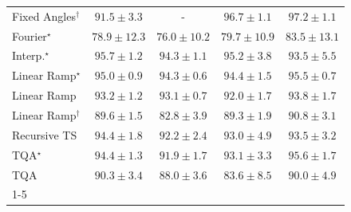 \begin{tabular}{l|cccc|}
Fixed Angles$^\dagger$ & {\cellcolor[HTML]{045D92}} \color[HTML]{F1F1F1} $91.5\pm 3.3$ & {\cellcolor[HTML]{000000}} \color[HTML]{F1F1F1} {\cellcolor{white}} \color{black} - & {\cellcolor[HTML]{023F64}} \color[HTML]{F1F1F1} $96.7\pm 1.1$ & {\cellcolor[HTML]{023C5F}} \color[HTML]{F1F1F1} $97.2\pm 1.1$ \\
Fourier$^\star$ & {\cellcolor[HTML]{4A98C5}} \color[HTML]{F1F1F1} $78.9\pm 12.3$ & {\cellcolor[HTML]{69A5CC}} \color[HTML]{F1F1F1} $76.0\pm 10.2$ & {\cellcolor[HTML]{4094C3}} \color[HTML]{F1F1F1} $79.7\pm 10.9$ & {\cellcolor[HTML]{1E80B8}} \color[HTML]{F1F1F1} $83.5\pm 13.1$ \\
Interp.$^\star$ & {\cellcolor[HTML]{03456C}} \color[HTML]{F1F1F1} $95.7\pm 1.2$ & {\cellcolor[HTML]{034D79}} \color[HTML]{F1F1F1} $94.3\pm 1.1$ & {\cellcolor[HTML]{034871}} \color[HTML]{F1F1F1} $95.2\pm 3.8$ & {\cellcolor[HTML]{045280}} \color[HTML]{F1F1F1} $93.5\pm 5.5$ \\
Linear Ramp$^\star$ & {\cellcolor[HTML]{034973}} \color[HTML]{F1F1F1} $95.0\pm 0.9$ & {\cellcolor[HTML]{034D79}} \color[HTML]{F1F1F1} $94.3\pm 0.6$ & {\cellcolor[HTML]{034C78}} \color[HTML]{F1F1F1} $94.4\pm 1.5$ & {\cellcolor[HTML]{03466E}} \color[HTML]{F1F1F1} $95.5\pm 0.7$ \\
Linear Ramp & {\cellcolor[HTML]{045483}} \color[HTML]{F1F1F1} $93.2\pm 1.2$ & {\cellcolor[HTML]{045585}} \color[HTML]{F1F1F1} $93.1\pm 0.7$ & {\cellcolor[HTML]{045B8E}} \color[HTML]{F1F1F1} $92.0\pm 1.7$ & {\cellcolor[HTML]{03517E}} \color[HTML]{F1F1F1} $93.8\pm 1.7$ \\
Linear Ramp$^\dagger$ & {\cellcolor[HTML]{04649D}} \color[HTML]{F1F1F1} $89.6\pm 1.5$ & {\cellcolor[HTML]{2484BA}} \color[HTML]{F1F1F1} $82.8\pm 3.9$ & {\cellcolor[HTML]{05659F}} \color[HTML]{F1F1F1} $89.3\pm 1.9$ & {\cellcolor[HTML]{045F95}} \color[HTML]{F1F1F1} $90.8\pm 3.1$ \\
Recursive TS & {\cellcolor[HTML]{034C78}} \color[HTML]{F1F1F1} $94.4\pm 1.8$ & {\cellcolor[HTML]{045A8D}} \color[HTML]{F1F1F1} $92.2\pm 2.4$ & {\cellcolor[HTML]{045585}} \color[HTML]{F1F1F1} $93.0\pm 4.9$ & {\cellcolor[HTML]{045280}} \color[HTML]{F1F1F1} $93.5\pm 3.2$ \\
TQA$^\star$ & {\cellcolor[HTML]{034C78}} \color[HTML]{F1F1F1} $94.4\pm 1.3$ & {\cellcolor[HTML]{045B8E}} \color[HTML]{F1F1F1} $91.9\pm 1.7$ & {\cellcolor[HTML]{045585}} \color[HTML]{F1F1F1} $93.1\pm 3.3$ & {\cellcolor[HTML]{03466E}} \color[HTML]{F1F1F1} $95.6\pm 1.7$ \\
TQA & {\cellcolor[HTML]{046198}} \color[HTML]{F1F1F1} $90.3\pm 3.4$ & {\cellcolor[HTML]{056AA6}} \color[HTML]{F1F1F1} $88.0\pm 3.6$ & {\cellcolor[HTML]{1C7FB8}} \color[HTML]{F1F1F1} $83.6\pm 8.5$ & {\cellcolor[HTML]{04629A}} \color[HTML]{F1F1F1} $90.0\pm 4.9$ \\
\cline{1-5}
\bottomrule
\end{tabular}
